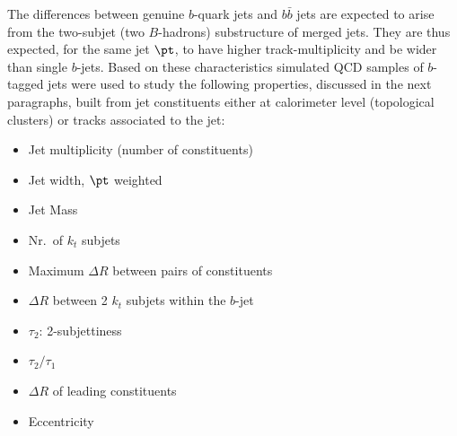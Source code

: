 The differences between genuine $b$-quark jets and $b \bar{b}$ jets are expected to arise from the two-subjet (two $B$-hadrons) substructure of merged jets.  They are thus expected, for the same jet $\pt$, to have higher track-multiplicity and be wider than single $b$-jets. Based on these characteristics %
simulated QCD samples of $b$-tagged jets were used to study the following properties, discussed in the next paragraphs, built from jet constituents either at calorimeter level (topological clusters) or tracks associated to the jet:

\begin{itemize}\addtolength{\itemsep}{-0.4\baselineskip}
\item
Jet multiplicity (number of constituents)
\item
Jet width, $\pt$ weighted %
\item 
Jet Mass
\item
Nr.\ of $k_t$ subjets %
\item
Maximum $\Delta R$ between pairs of constituents %
\item
$\Delta R$ between 2 $k_t$ subjets within the $b$-jet
\item
$\tau_2$: 2-subjettiness 
\item
$\tau_2/\tau_1$
\item
$\Delta R$ of leading constituents %
\item 
Eccentricity %
\end{itemize}



